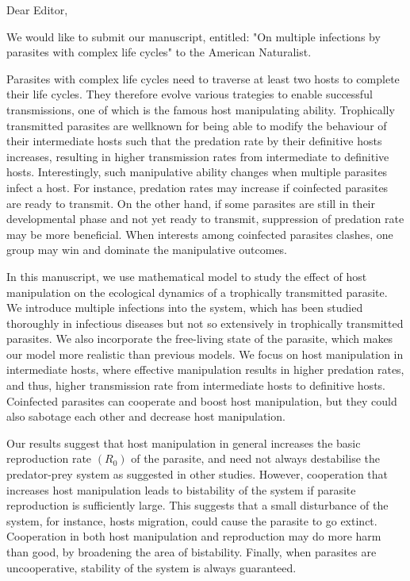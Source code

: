 Dear Editor,

We would like to submit our manuscript, entitled: "On multiple infections by parasites with complex life cycles"
to the American Naturalist.

Parasites with complex life cycles need to traverse at least two hosts to complete their life cycles.
They therefore evolve various trategies to enable successful transmissions, 
one of which is the famous host manipulating ability.
Trophically transmitted parasites are wellknown for being able to modify the behaviour of their
intermediate hosts such that the predation rate by their definitive hosts increases, 
resulting in higher transmission rates from intermediate to definitive hosts.
Interestingly, such manipulative ability changes when multiple parasites infect a host. 
For instance, predation rates may increase if coinfected parasites are ready to transmit. 
On the other hand, if some parasites are still in their developmental phase and not yet
ready to transmit, suppression of predation rate may be more beneficial.
When interests among coinfected parasites clashes, one group may win and dominate the manipulative outcomes.

In this manuscript, we use mathematical model to study the effect of host manipulation 
on the ecological dynamics of a trophically transmitted parasite.
We introduce multiple infections into the system, which has been studied thoroughly in
infectious diseases but not so extensively in trophically transmitted parasites.
We also incorporate the free-living state of the parasite, which makes our model more realistic than previous models.
We focus on host manipulation in intermediate hosts, where effective manipulation results in higher predation rates, 
and thus, higher transmission rate from intermediate hosts to definitive hosts.
Coinfected parasites can cooperate and boost host manipulation,
but they could also sabotage each other and decrease host manipulation.

Our results suggest that host manipulation in general increases the basic reproduction rate $(R_0)$ of the parasite,
and need not always destabilise the predator-prey system as suggested in other studies.
However, cooperation that increases host manipulation leads to bistability of the system if parasite reproduction is sufficiently large.
This suggests that a small disturbance of the system, for instance, hosts migration, could cause the parasite to go extinct.
Cooperation in both host manipulation and reproduction may do more harm than good, by broadening the area of bistability.
Finally, when parasites are uncooperative, stability of the system is always guaranteed.

